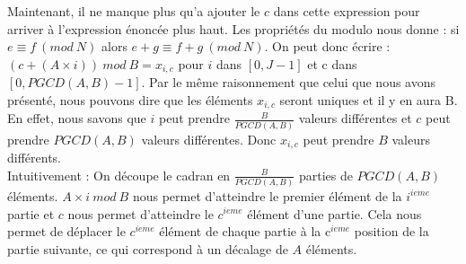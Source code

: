 Maintenant, il ne manque plus qu'a ajouter le $c$ dans cette expression pour arriver à l'expression énoncée plus haut. Les propriétés du modulo nous donne : si $e ≡ f\ (mod\ N)$ alors $e+g ≡ f+g\ (mod\ N)$. On peut donc écrire : $(c +(A\times i))\ mod\ B = x_{i,c}$ pour $i$ dans $[0, J-1]$ et c dans $[0, PGCD(A,B) -1]$. Par le même raisonnement que celui que nous avons présenté, nous pouvons dire que les éléments $x_{i,c}$ seront uniques et il y en aura B.\\
En effet, nous savons que $i$ peut prendre $\frac{B}{PGCD(A,B)}$ valeurs différentes et $c$ peut prendre $PGCD(A,B)$ valeurs différentes. Donc $x_{i,c}$ peut prendre $B$ valeurs différents.\\

Intuitivement : On découpe le cadran en $\frac{B}{PGCD(A,B)}$ parties de $PGCD(A,B)$ éléments. 
$A\times i\ mod\ B$ nous permet d'atteindre le premier élément de la $i^{ieme}$ partie et $c$ nous permet d'atteindre le $c^{ieme}$ élément d'une partie. 
Cela nous permet de déplacer le $c^{ieme}$ élément de chaque partie à la c$^{ieme}$ position de la partie suivante, ce qui correspond à un décalage de $A$ éléments.